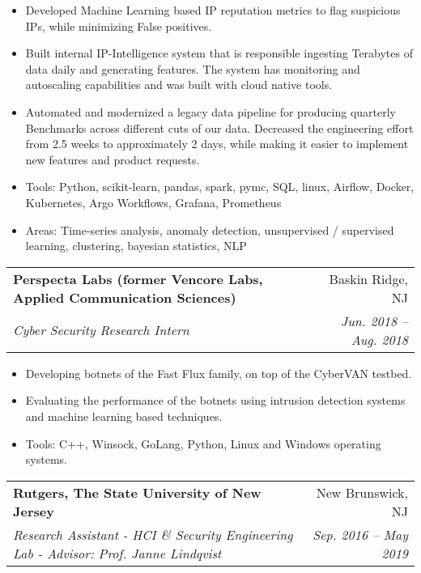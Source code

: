 \documentclass[letterpaper,10pt]{article}
\makeatletter
\newcommand{\resumeSubheading}[4]{
  \vspace{-1pt}\item
    \begin{tabular*}{0.97\textwidth}{l@{\extracolsep{\fill}}r}
      \textbf{#1} & #2 \\
      \textit{\small#3} & \textit{\small #4} \\
    \end{tabular*}\vspace{-5pt}
}
\makeatother
\begin{document}
\begin{itemize}
  \item Developed Machine Learning based IP reputation metrics to flag suspicious IPs, while minimizing False positives. 
  \item Built internal IP-Intelligence system that is responsible ingesting Terabytes of data daily and generating features. The system 
  has monitoring and autoscaling capabilities and was built with cloud native tools.
  \item Automated and modernized a legacy data pipeline for producing quarterly Benchmarks across different cuts of our data. 
  Decreased the engineering effort from 2.5 weeks to approximately 2 days, while making it easier to implement new features and product requests.
  \item{Tools: } {Python, scikit-learn, pandas, spark, pymc, SQL, linux, Airflow, Docker, Kubernetes, Argo Workflows, Grafana, Prometheus}
  \item{Areas: } {Time-series analysis, anomaly detection, unsupervised / supervised learning, clustering, bayesian statistics, NLP}
\end{itemize}
\resumeSubheading
{Perspecta Labs (former Vencore Labs, Applied Communication Sciences)}{Baskin Ridge, NJ}
{Cyber Security Research Intern}{Jun. 2018 -- Aug. 2018}
\begin{itemize}
  \item Developing botnets of the Fast Flux family, on top of the CyberVAN testbed.
  \item Evaluating the performance of the botnets using intrusion detection systems and machine learning based techniques.
  \item{Tools: }{C++, Winsock, GoLang, Python, Linux and Windows operating systems.}
\end{itemize}
\resumeSubheading
{Rutgers, The State University of New Jersey}{New Brunswick, NJ}
{Research Assistant - HCI \& Security Engineering Lab - Advisor: Prof. Janne Lindqvist}{Sep. 2016 -- May 2019}
\end{document}

